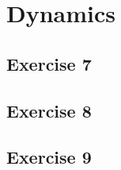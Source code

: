 \begin{solution}
    \lipsum[12]
\end{solution}

\section{Dynamics}
\subsection{Exercise 7}
\lipsum[13]

\begin{solution}
    \lipsum[14]
\end{solution}

\subsection{Exercise 8}
\lipsum[15]

\begin{solution}
    \lipsum[16]
\end{solution}

\subsection{Exercise 9}
\lipsum[17]

\begin{solution}
    \lipsum[18]
\end{solution}
